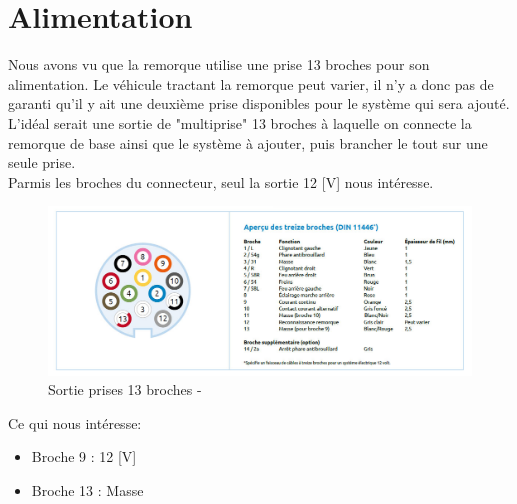 \section{Alimentation}
Nous avons vu que la remorque utilise une prise 13 broches pour son alimentation. Le véhicule tractant la remorque peut varier, il n'y a donc pas de
garanti qu'il y ait une deuxième prise disponibles pour le système qui sera ajouté. L'idéal serait une sortie de "multiprise" 13 broches à laquelle
on connecte la remorque de base ainsi que le système à ajouter, puis brancher le tout sur une seule prise.\\
Parmis les broches du connecteur, seul la sortie 12 [V] nous intéresse.
\begin{figure}[H]
    \centering
    \includegraphics[width=14cm]{assets/figures/broches.jpg}
    \caption{Sortie prises 13 broches - \cite{prise}}
\end{figure}
Ce qui nous intéresse:
\begin{itemize}
    \item Broche 9  : 12 [V]
    \item Broche 13 : Masse
\end{itemize}
\newpage


